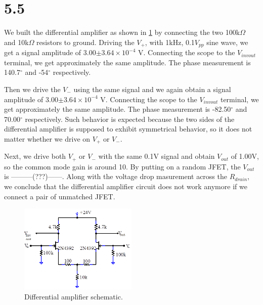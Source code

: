 \documentclass[authoryear, 12pt,5p, times]{elsarticle}
\begin{document}
\section*{5.5}
 We built the differential amplifier as shown in \ref{q5setup} by connecting the two 100k$\Omega$ and 10k$\Omega$ resistors to ground. Driving the $V_+$, with 1kHz, 0.1$V_{pp}$ sine wave, we get a signal amplitude of 3.00$\pm3.64\times10^{-4}$ V. Connecting the scope to the $V_{invout}$ terminal, we get approximately the same amplitude. The phase measurement is 140.7$^{\circ}$  and -54$^{\circ}$  respectively.
 \par Then we drive the $V_-$ using the same signal and we again obtain a signal amplitude of 3.00$\pm3.64\times10^{-4}$ V. Connecting the scope to the $V_{invout}$ terminal, we get approximately the same amplitude. The phase measurement is -82.50$^{\circ}$ and 70.00$^{\circ}$  respectively. Such behavior is expected because the two sides of the differential amplifier is supposed to exhibit symmetrical behavior, so it does not matter whether we drive on $V_{+}$ or $V_{-}$.
 \par Next, we drive both $V_{+}$ or $V_{-}$ with the same 0.1V signal and obtain $V_{out}$ of 1.00V, so the common mode gain is around 10. By putting on a random JFET, the $V_{out}$ is ---------(???)------. Along with the voltage drop masurement across the $R_{drain}$, we conclude that the differential amplifier circuit does not work anymore if we connect a pair of unmatched JFET. 
 \begin{figure}
 \centering
 \includegraphics[width=0.5\textwidth]{figure/q5setup}
\caption{Differential amplifier schematic.}
\label{q5setup}
 \end{figure}
\end{document}
